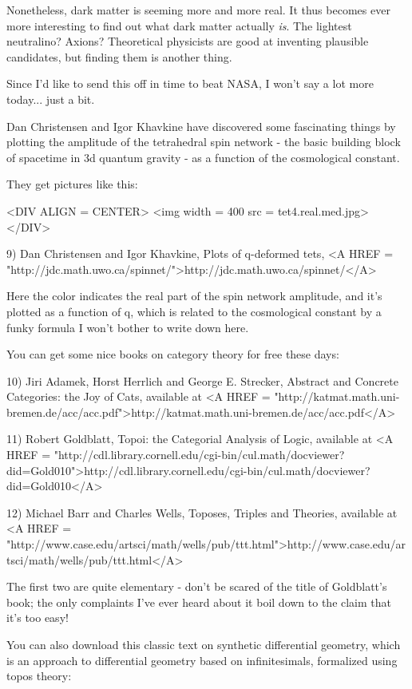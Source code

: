 Nonetheless, dark matter is seeming more and more real.  
It thus becomes ever more interesting to find out what dark matter
actually \emph{is}.  The lightest neutralino?  Axions?  Theoretical
physicists are good at inventing plausible candidates, but finding
them is another thing.

Since I'd like to send this off in time to beat NASA, I won't say a
lot more today... just a bit.  

Dan Christensen and Igor Khavkine have discovered some fascinating 
things by plotting the amplitude of the tetrahedral spin network - 
the basic building block of spacetime in 3d quantum gravity - as 
a function of the cosmological constant.  

They get pictures like this:

<DIV ALIGN = CENTER>
<img width = 400 src = tet4.real.med.jpg>
</DIV>

9) Dan Christensen and Igor Khavkine, Plots of q-deformed tets,
<A HREF = "http://jdc.math.uwo.ca/spinnet/">http://jdc.math.uwo.ca/spinnet/</A>

Here the color indicates the real part of the spin network amplitude,
and it's plotted as a function of q, which is related to the 
cosmological constant by a funky formula I won't bother to write down
here.

You can get some nice books on category theory for free these days:

10) Jiri Adamek, Horst Herrlich and George E. Strecker, 
Abstract and Concrete Categories: the Joy of Cats, available at 
<A HREF = "http://katmat.math.uni-bremen.de/acc/acc.pdf">http://katmat.math.uni-bremen.de/acc/acc.pdf</A>

11) Robert Goldblatt, Topoi: the Categorial Analysis of Logic,
available at 
<A HREF = "http://cdl.library.cornell.edu/cgi-bin/cul.math/docviewer?did=Gold010">http://cdl.library.cornell.edu/cgi-bin/cul.math/docviewer?did=Gold010</A>

12) Michael Barr and Charles Wells, Toposes, Triples and Theories,
available at <A HREF = "http://www.case.edu/artsci/math/wells/pub/ttt.html">http://www.case.edu/artsci/math/wells/pub/ttt.html</A>

The first two are quite elementary - don't be scared of the title
of Goldblatt's book; the only complaints I've ever heard about it
boil down to the claim that it's too easy!

You can also download this classic text on synthetic differential
geometry, which is an approach to differential geometry based on
infinitesimals, formalized using topos theory:

